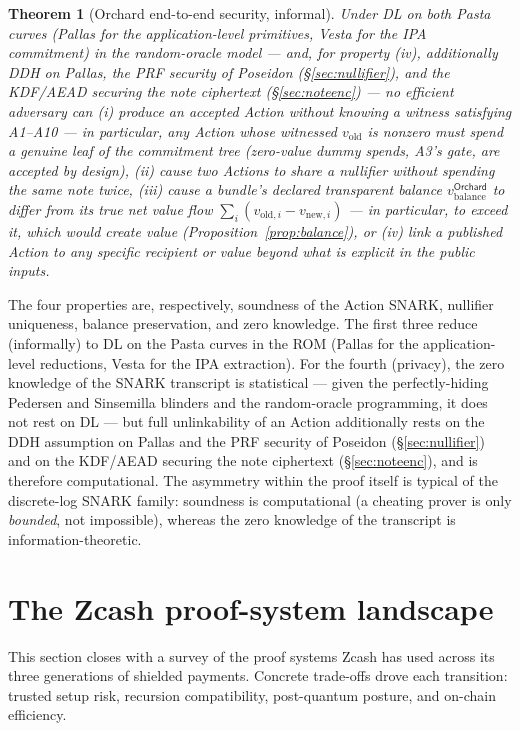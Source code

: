 \documentclass[11pt,a4paper]{article}
\newtheorem{theorem}{Theorem}[section]
\theoremstyle{definition}
\begin{document}
\begin{theorem}[Orchard end-to-end security, informal]\label{thm:orchard-e2e}
Under DL on both Pasta curves (Pallas for the application-level
primitives, Vesta for the IPA commitment) in the random-oracle model ---
and, for property (iv), additionally DDH on Pallas, the PRF security of
Poseidon (\S\ref{sec:nullifier}), and the KDF/AEAD securing the note
ciphertext (\S\ref{sec:noteenc}) --- no efficient adversary
can (i) produce an accepted Action without knowing a witness satisfying
A1--A10 --- in particular, any Action whose witnessed $v_{\mathrm{old}}$ is
nonzero must spend a genuine leaf of the commitment tree (zero-value dummy
spends, A3's gate, are accepted by design), (ii) cause two Actions to share
a nullifier without spending the same note twice, (iii) cause a bundle's
declared transparent balance $v_{\mathrm{balance}}^{\mathsf{Orchard}}$ to
differ from its true net value flow
$\sum_i (v_{\mathrm{old},i} - v_{\mathrm{new},i})$ --- in particular, to
exceed it, which would create value (Proposition~\ref{prop:balance}), or
(iv) link a published Action to any specific recipient or value beyond
what is explicit in the public inputs.
\end{theorem}

The four properties are, respectively, soundness of the Action SNARK,
nullifier uniqueness, balance preservation, and zero knowledge. The first
three reduce (informally) to DL on the Pasta curves in the ROM (Pallas
for the application-level reductions, Vesta for the IPA extraction). For
the fourth (privacy), the zero knowledge of the SNARK transcript is
statistical --- given the perfectly-hiding Pedersen and Sinsemilla
blinders and the random-oracle programming, it does not rest on DL ---
but full unlinkability of an Action additionally rests on the DDH
assumption on Pallas and the PRF security of Poseidon
(\S\ref{sec:nullifier}) and on the KDF/AEAD securing the note ciphertext
(\S\ref{sec:noteenc}), and is therefore computational. The asymmetry
within the proof itself is typical of the discrete-log SNARK family:
soundness is computational (a cheating prover is only \emph{bounded},
not impossible), whereas the zero knowledge of the transcript is
information-theoretic.

\section{The Zcash proof-system landscape}\label{sec:zcash}

This section closes with a survey of the proof systems Zcash has used across its
three generations of shielded payments. Concrete trade-offs drove each transition:
trusted setup risk, recursion compatibility, post-quantum
posture, and on-chain efficiency.
\end{document}

